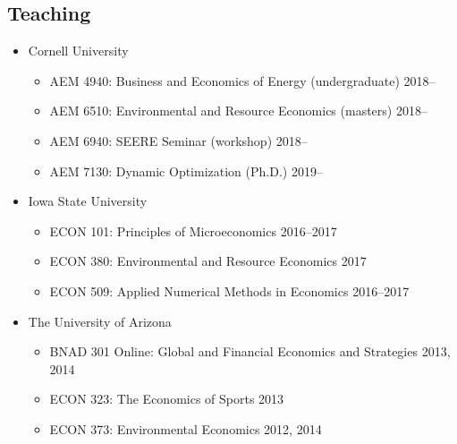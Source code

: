 \documentclass{res} %
\begin{document}
\begin{resume}
\section{Teaching}
\begin{itemize}
	\item[] Cornell University
	\vspace{-0.05in}
	\begin{itemize} \itemsep -1pt
		\item[] AEM 4940: Business and Economics of Energy (undergraduate) \hfill 2018--
		\item[] AEM 6510: Environmental and Resource Economics (masters) \hfill 2018--
		\item[] AEM 6940: SEERE Seminar (workshop) \hfill 2018--
		\item[] AEM 7130: Dynamic Optimization (Ph.D.) \hfill 2019--	
	\end{itemize}
	\item[] Iowa State University
	\vspace{-0.05in}
	\begin{itemize} \itemsep -1pt
		\item[] ECON 101: Principles of Microeconomics \hfill 2016--2017
		\item[] ECON 380: Environmental and Resource Economics \hfill 2017
		\item[] ECON 509: Applied Numerical Methods in Economics \hfill 2016--2017
	\end{itemize}
	\item[] The University of Arizona
	\vspace{-0.05in}
	\begin{itemize} \itemsep -1pt %
		\item[] BNAD 301 Online: Global and Financial Economics and Strategies \hfill 2013, 2014
		\item[] ECON 323: The Economics of Sports \hfill 2013
		\item[] ECON 373: Environmental Economics \hfill 2012, 2014
	\end{itemize}
\end{itemize}
\vspace{-.075in}


\end{resume}
\end{document}
